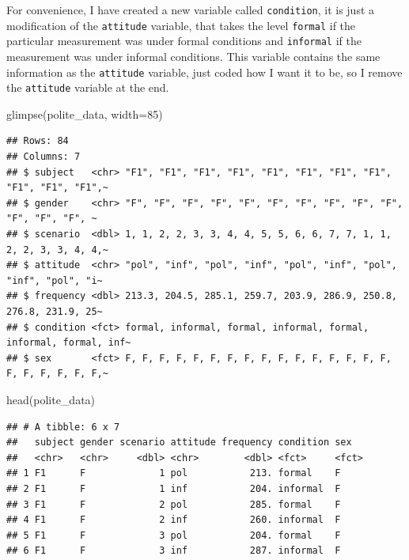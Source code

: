 \documentclass[
  openany]{book}
\newenvironment{Shaded}{\begin{snugshade}}{\end{snugshade}}
\newcommand{\AttributeTok}[1]{\textcolor[rgb]{0.77,0.63,0.00}{#1}}
\newcommand{\DecValTok}[1]{\textcolor[rgb]{0.00,0.00,0.81}{#1}}
\newcommand{\FunctionTok}[1]{\textcolor[rgb]{0.00,0.00,0.00}{#1}}
\newcommand{\NormalTok}[1]{#1}
\begin{document}
For convenience, I have created a new variable called \texttt{condition}, it is just a modification of the \texttt{attitude} variable, that takes the level \texttt{formal} if the particular measurement was under formal conditions and \texttt{informal} if the measurement was under informal conditions. This variable contains the same information as the \texttt{attitude} variable, just coded how I want it to be, so I remove the \texttt{attitude} variable at the end.

\begin{Shaded}
\begin{Highlighting}[]
\FunctionTok{glimpse}\NormalTok{(polite\_data, }\AttributeTok{width=}\DecValTok{85}\NormalTok{)}
\end{Highlighting}
\end{Shaded}

\begin{verbatim}
## Rows: 84
## Columns: 7
## $ subject   <chr> "F1", "F1", "F1", "F1", "F1", "F1", "F1", "F1", "F1", "F1", "F1",~
## $ gender    <chr> "F", "F", "F", "F", "F", "F", "F", "F", "F", "F", "F", "F", "F", ~
## $ scenario  <dbl> 1, 1, 2, 2, 3, 3, 4, 4, 5, 5, 6, 6, 7, 7, 1, 1, 2, 2, 3, 3, 4, 4,~
## $ attitude  <chr> "pol", "inf", "pol", "inf", "pol", "inf", "pol", "inf", "pol", "i~
## $ frequency <dbl> 213.3, 204.5, 285.1, 259.7, 203.9, 286.9, 250.8, 276.8, 231.9, 25~
## $ condition <fct> formal, informal, formal, informal, formal, informal, formal, inf~
## $ sex       <fct> F, F, F, F, F, F, F, F, F, F, F, F, F, F, F, F, F, F, F, F, F, F,~
\end{verbatim}

\begin{Shaded}
\begin{Highlighting}[]
\FunctionTok{head}\NormalTok{(polite\_data)}
\end{Highlighting}
\end{Shaded}

\begin{verbatim}
## # A tibble: 6 x 7
##   subject gender scenario attitude frequency condition sex  
##   <chr>   <chr>     <dbl> <chr>        <dbl> <fct>     <fct>
## 1 F1      F             1 pol           213. formal    F    
## 2 F1      F             1 inf           204. informal  F    
## 3 F1      F             2 pol           285. formal    F    
## 4 F1      F             2 inf           260. informal  F    
## 5 F1      F             3 pol           204. formal    F    
## 6 F1      F             3 inf           287. informal  F
\end{verbatim}
\end{document}
